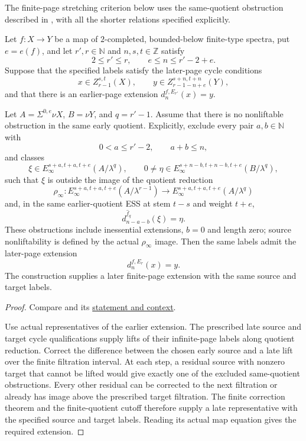 \begin{corollary}
\label{paper:6.23}
The finite-page stretching criterion below uses the same-quotient
obstruction described in \cite[Corollary 6.23]{LWX126}, with all the
shorter relations specified explicitly.\par
\label{cor:dfc6043e}
Let $f:X\to Y$ be a map of $2$-completed, bounded-below finite-type spectra, put $e=e(f)$, and let $r',r\in\mathbb N$ and $n,s,t\in\mathbb Z$ satisfy
\[
2\le r'\le r,\qquad e\le n\le r'-2+e.
\]
Suppose that the specified labels satisfy the later-page cycle conditions
\[
x\in Z_{r-1}^{s,t}(X),\qquad
y\in Z_{r-1-n+e}^{s+n,t+n}(Y),
\]
and that there is an earlier-page extension $d_n^{f,E_{r'}}(x)=y$.

Let $A=\Sigma^{0,e}\nu X$, $B=\nu Y$, and $q=r'-1$. Assume that there is no nonliftable obstruction in the same early quotient. Explicitly, exclude every pair $a,b\in\mathbb N$ with
\[
0<a\le r'-2,\qquad a+b\le n,
\]
and classes
\[
\xi\in E_\infty^{s+a,t+a,t+e}(A/\lambda^q),\qquad
0\ne\eta\in E_\infty^{s+n-b,t+n-b,t+e}(B/\lambda^q),
\]
such that $\xi$ is outside the image of the quotient reduction
\[
\rho_\infty:E_\infty^{s+a,t+a,t+e}(A/\lambda^{r-1})
\longrightarrow E_\infty^{s+a,t+a,t+e}(A/\lambda^q)
\]
and, in the same earlier-quotient ESS at stem $t-s$ and weight $t+e$,
\[
d_{n-a-b}^{\hat f_q}(\xi)=\eta.
\]
These obstructions include inessential extensions, $b=0$ and length zero; source nonliftability is defined by the actual $\rho_\infty$ image. Then the same labels admit the later-page extension
\[
d_n^{f,E_r}(x)=y.
\]
The construction supplies a later finite-page extension with the same source and target labels.

\end{corollary}
\begin{proof}
Compare \cite[Corollary 6.23]{LWX126} and its
\href{paper/main.tex.html#L2074}{statement and context}.

Use actual representatives of the earlier extension. The prescribed late source and target cycle qualifications supply lifts of their infinite-page labels along quotient reduction. Correct the difference between the chosen early source and a late lift over the finite filtration interval. At each step, a residual source with nonzero target that cannot be lifted would give exactly one of the excluded same-quotient obstructions. Every other residual can be corrected to the next filtration or already has image above the prescribed target filtration. The finite correction theorem and the finite-quotient cutoff therefore supply a late representative with the specified source and target labels. Reading its actual map equation gives the required extension.

\end{proof}

